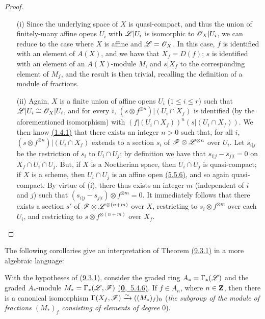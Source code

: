 \begin{proof}
\label{proof-thm-1.9.3.1}
\medskip\noindent
\begin{itemize}
  \item[(i)] Since the underlying space of $X$ is quasi-compact, and thus the union of
        finitely-many affine opens $U_i$ with $\mathscr{L}|U_i$ is isomorphic to
        $\mathscr{O}_X|U_i$, we can reduce to the case where $X$ is affine and $\mathscr{L}=\mathscr{O}_X$.
        In this case, $f$ is identified with an element of $A(X)$, and we have that
        $X_f=D(f)$; $s$ is identified with an element of an $A(X)$-module $M$, and
        $s|X_f$ to the corresponding element of $M_f$, and the result is then trivial,
        recalling the definition of a module of fractions.
  \item[(ii)] Again, $X$ is a finite union of affine opens $U_i$ ($1\leqslant i\leqslant r$)
        such that $\mathscr{L}|U_i\cong\mathscr{O}_X|U_i$, and for every $i$,
        $(s\otimes f^{\otimes n})|(U_i\cap X_f)$ is identified (by the aforementioned
        isomorphism) with $(f|(U_i\cap X_f))^n(s|(U_i\cap X_f))$. We then know
        \hyperref[thm-1.1.4.1]{(1.4.1)} that there exists an integer $n>0$ such that, for all
        $i$, $(s\otimes f^{\otimes n})|(U_i\cap X_f)$ extends to a section $s_i$ of
        $\mathscr{F}\otimes\mathscr{L}^{\otimes n}$ over $U_i$. Let $s_{i|j}$ be the restriction
        of $s_i$ to $U_i\cap U_j$; by definition we have that $s_{i|j}-s_{j|i}=0$ on
        $X_f\cap U_i\cap U_j$. But, if $X$ is a Noetherian space, then $U_i\cap U_j$ is
        quasi-compact; if $X$ is a scheme, then $U_i\cap U_j$ is an affine open
        \hyperref[env-1.5.5.6]{(5.5.6)}, and so again quasi-compact. By virtue of (i), there thus
        exists an integer $m$ (independent of $i$ and $j$) such that
        $(s_{i|j}-s_{j|i})\otimes f^{\otimes m}=0$. It immediately follows that there
        exists a section $s'$ of $\mathscr{F}\otimes\mathscr{L}^{\otimes(n+m)}$ over $X$,
        restricting to $s_i\otimes f^{\otimes m}$ over each $U_i$, and restricting to
        $s\otimes f^{\otimes(n+m)}$ over $X_f$.
\end{itemize}
\end{proof}

The following corollaries give an interpretation of Theorem \hyperref[thm-1.9.3.1]{(9.3.1)} in a more
algebraic language:
\begin{cor}[9.3.2]
\label{cor-1.9.3.2}
With the hypotheses of \hyperref[thm-1.9.3.1]{(9.3.1)}, consider the graded ring $A_*=\Gamma_*(\mathscr{L})$
and the graded $A_*$-module $M_*=\Gamma_*(\mathscr{L},\mathscr{F})$ \hyperref[env-0.5.4.6]{(\textbf{0},~5.4.6)}. If $f\in A_n$,
where $n\in\mathbf{Z}$, then there is a canonical isomorphism
$\Gamma(X_f,\mathscr{F})\xrightarrow{\sim}((M_*)_f)_0$ ({\it the subgroup of the module of
fractions $(M_*)_f$ consisting of elements of degree $0$}).
\end{cor}

